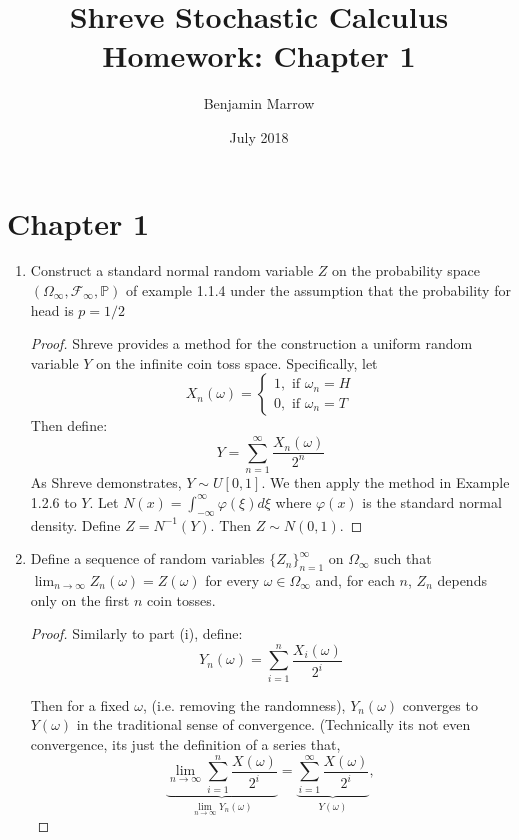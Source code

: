 \documentclass{article}
\title{Shreve Stochastic Calculus Homework: Chapter 1 \vspace{-1eX}}
\author{Benjamin Marrow \vspace{-1.5eX}}
\date{ July 2018  \vspace{-1eX}}
\makeatletter
\newcommand{\p}{\mathbb{P}}
\newcommand{\F}{\mathcal{F}}
\newcommand{\ds}{\displaystyle}
\newcommand{\mylabel}[2]{#2\def\@currentlabel{#2}\label{#1}}
\newcommand{\pr}[1]{ \item[\mylabel{}{#1.}]}
\newcommand{\limit}[1]{\underset{#1}{\lim}}
\newcommand{\seq}[1]{\{ #1 \}}
\theoremstyle{definition}
\theoremstyle{definition}
\makeatother
\begin{document}
\maketitle


\section*{Chapter 1}

\begin{enumerate}
    \pr{1.4 (i)} Construct a standard normal random variable $Z$ on the probability space $(\Omega_\infty,\F_\infty,\p)$ of example 1.1.4 under the assumption that the probability for head is $p=1/2$
    \begin{proof} Shreve provides a method for the construction a uniform random variable $Y$ on the infinite coin toss space. Specifically, let 
    $$ X_n(\omega) = \begin{cases} 1, \text{ if } \omega_n = H \\ 0, \text{ if } \omega_n = T  \end{cases}$$
    Then define: 
    $$ Y = \sum_{n=1}^\infty \frac{X_n (\omega) }{2^n} $$
    As Shreve demonstrates, $Y\sim U[0,1]$. We then apply the method in Example 1.2.6 to $Y$. Let $N(x) = \int_{-\infty}^\infty \varphi(\xi) d\xi$ where $\varphi(x)$ is the standard normal density. Define $ Z = N^{-1}(Y)$. Then $Z\sim N(0,1)$.
    
    \end{proof}
    
    \pr{(ii)} Define a sequence of random variables $\seq{Z_n}_{n=1}^\infty$ on $\Omega_\infty$ such that $\displaystyle \lim_{n \to \infty} Z_n(\omega) = Z(\omega)$ for every $\omega \in \Omega_\infty$ and, for each $n$, $Z_n$ depends only on the first $n$ coin tosses.
    
    \begin{proof} Similarly to part (i), define:
    $$\ds Y_n(\omega) = \sum_{i=1}^n \frac{X_i(\omega)}{2^i}$$
    
    Then for a fixed $\omega$, (i.e. removing the randomness), $Y_n(\omega)$ converges to $Y(\omega)$ in the traditional sense of convergence. (Technically its not even convergence, its just the definition of a series that,
    $$ \underset{\limit{n\to\infty} Y_n(\omega)}{\underbrace{\limit{n \to \infty} \sum_{i=1}^n \frac{X(\omega)}{2^i}}}= \underset{Y(\omega)}{\underbrace{\sum_{i=1}^\infty \frac{X(\omega)}{2^i}}},$$
    

\end{proof}
\end{enumerate}
\end{document}
